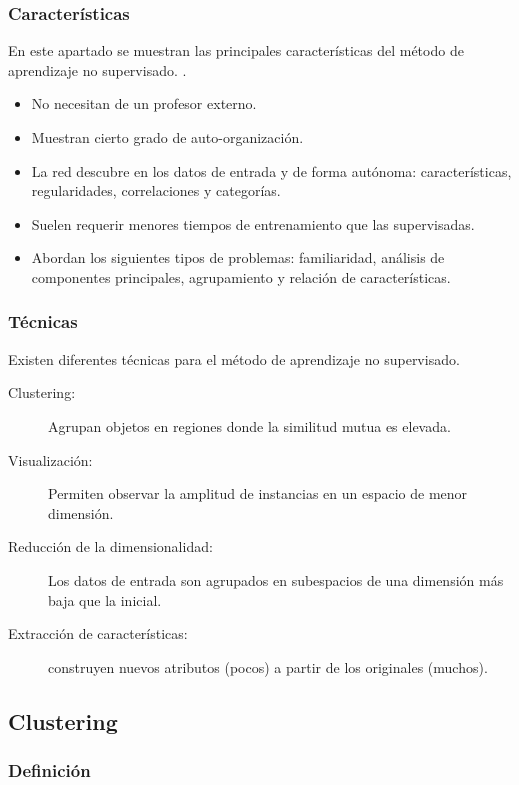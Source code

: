 \subsubsection{Características}

En este apartado se muestran las principales características del método de aprendizaje no supervisado. \citep{Hinton_Sejnowski}.

\begin{itemize}
\item No necesitan de un profesor externo.
\item Muestran cierto grado de auto-organización.
\item La red descubre en los datos de entrada y de forma autónoma: características, regularidades, correlaciones y categorías.
\item Suelen requerir menores tiempos de entrenamiento que las supervisadas.
\item Abordan los siguientes tipos de problemas: familiaridad, análisis de componentes principales, agrupamiento y relación de características.
\end{itemize}

\subsubsection{Técnicas}
Existen diferentes técnicas para el método de aprendizaje no supervisado.

\begin{description}
	\item[Clustering:] Agrupan objetos en regiones donde la similitud mutua es elevada.
	\item[Visualización:] Permiten observar la amplitud de instancias en un espacio de menor dimensión.
	\item[Reducción de la dimensionalidad:] Los datos de entrada son agrupados en subespacios de una dimensión más baja que la inicial.
	\item[Extracción de características:] construyen nuevos atributos (pocos) a partir de los originales (muchos).
\end{description}


\subsection{Clustering}

\subsubsection{Definición}

